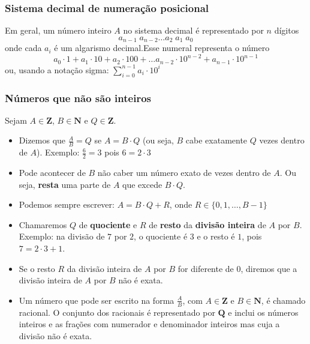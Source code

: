 \documentclass{beamer}
\begin{document}
\begin{frame}
\frametitle{Sistema decimal de numeração posicional}

Em geral, um número inteiro $A$ no sistema decimal é representado por $n$ dígitos
\[
a_{n-1} \; a_{n-2} \ldots a_2 \; a_1 \; a_0
\]
onde cada $a_i$ é um algarismo decimal.\pause Esse numeral representa o número
\[
a_0 \cdot 1 + a_1 \cdot 10 + a_2 \cdot 100 + \ldots a_{n-2} \cdot 10^{n-2} + a_{n-1} \cdot 10^{n-1}
\]
\pause
ou, usando a notação sigma: $\displaystyle \sum_{i = 0}^{n-1} a_i \cdot 10^i$
\end{frame}

\begin{frame}
\frametitle{Números que não são inteiros}

Sejam $A \in \mathbf{Z}$, $B \in \mathbf{N}$ e $Q \in \mathbf{Z}$.

\begin{itemize}
\item Dizemos que $\frac{A}{B} = Q$ se $A = B \cdot Q$ (ou seja, $B$ cabe exatamente $Q$ vezes dentro de $A$). Exemplo: $\frac{6}{2} = 3$ pois $6 = 2 \cdot 3$
\pause
\item Pode acontecer de $B$ não caber um número exato de vezes dentro de $A$. Ou seja, \textbf{resta} uma parte de $A$ que excede $B \cdot Q$. 
\pause
\item Podemos sempre escrever: $A = B \cdot Q + R$, onde $R \in \{0, 1, \ldots, B-1\}$
\pause
\item Chamaremos $Q$ de \textbf{quociente} e $R$ de \textbf{resto} da \textbf{divisão inteira} de $A$ por $B$. Exemplo: na divisão de $7$ por $2$, o quociente é $3$ e o resto é $1$, pois $7 = 2 \cdot 3 + 1$.
\pause
\item Se o resto $R$ da divisão inteira de $A$ por $B$ for diferente de $0$, diremos que a divisão inteira de $A$ por $B$ não é exata.
\pause
\item Um número que pode ser escrito na forma $\frac{A}{B}$, com $A \in \mathbf{Z}$ e $B \in \mathbf{N}$, é chamado racional. O conjunto dos racionais é representado por $\mathbf{Q}$ e inclui os números inteiros e as frações com numerador e denominador inteiros mas cuja a divisão não é exata.
\end{itemize}
\end{frame}
\end{document}
